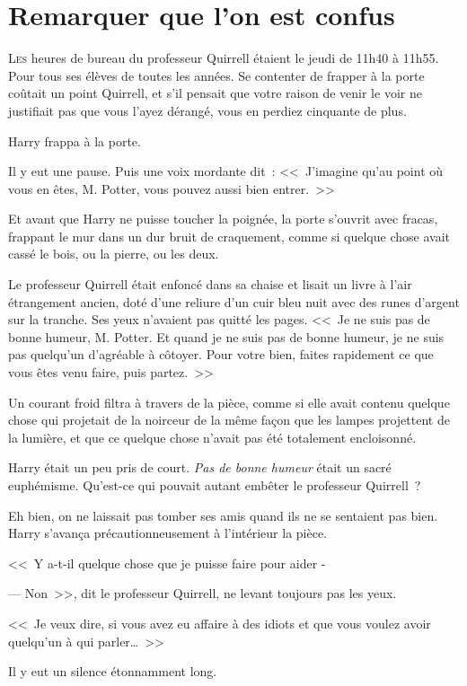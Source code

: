 \chapter{Remarquer que l'on est confus}

\lettrine{L}{es} heures de bureau du professeur Quirrell étaient le jeudi de 11h40 à 11h55. Pour tous ses élèves de toutes les années. Se contenter de frapper à la porte coûtait un point Quirrell, et s'il pensait que votre raison de venir le voir ne justifiait pas que vous l'ayez dérangé, vous en perdiez cinquante de plus.

Harry frappa à la porte.

Il y eut une pause. Puis une voix mordante dit~: <<~J'imagine qu'au point où vous en êtes, M. Potter, vous pouvez aussi bien entrer.~>>

Et avant que Harry ne puisse toucher la poignée, la porte s'ouvrit avec fracas, frappant le mur dans un dur bruit de craquement, comme si quelque chose avait cassé le bois, ou la pierre, ou les deux.

Le professeur Quirrell était enfoncé dans sa chaise et lisait un livre à l'air étrangement ancien, doté d'une reliure d'un cuir bleu nuit avec des runes d'argent sur la tranche. Ses yeux n'avaient pas quitté les pages. <<~Je ne suis pas de bonne humeur, M. Potter. Et quand je ne suis pas de bonne humeur, je ne suis pas quelqu'un d'agréable à côtoyer. Pour votre bien, faites rapidement ce que vous êtes venu faire, puis partez.~>>

Un courant froid filtra à travers de la pièce, comme si elle avait contenu quelque chose qui projetait de la noirceur de la même façon que les lampes projettent de la lumière, et que ce quelque chose n'avait pas été totalement encloisonné.

Harry était un peu pris de court. \emph{Pas de bonne humeur} était un sacré euphémisme. Qu'est-ce qui pouvait autant embêter le professeur Quirrell~?

Eh bien, on ne laissait pas tomber ses amis quand ils ne se sentaient pas bien. Harry s'avança précautionneusement à l'intérieur la pièce.

<<~Y a-t-il quelque chose que je puisse faire pour aider -

--- Non~>>, dit le professeur Quirrell, ne levant toujours pas les yeux.

<<~Je veux dire, si vous avez eu affaire à des idiots et que vous voulez avoir quelqu'un à qui parler…~>>

Il y eut un silence étonnamment long.

